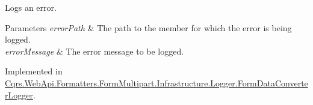 Logs an error. 


\begin{DoxyParams}{Parameters}
{\em error\+Path} & The path to the member for which the error is being logged.\\
\hline
{\em error\+Message} & The error message to be logged.\\
\hline
\end{DoxyParams}


Implemented in \hyperlink{classCqrs_1_1WebApi_1_1Formatters_1_1FormMultipart_1_1Infrastructure_1_1Logger_1_1FormDataConverterLogger_a72fcac7560a05dfebbff772a4216a5d8_a72fcac7560a05dfebbff772a4216a5d8}{Cqrs.\+Web\+Api.\+Formatters.\+Form\+Multipart.\+Infrastructure.\+Logger.\+Form\+Data\+Converter\+Logger}.


